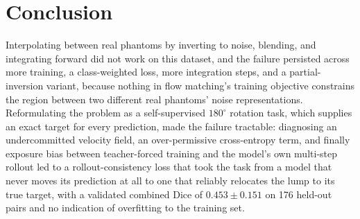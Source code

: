 \documentclass[11pt]{article}
\begin{document}
\section{Conclusion}
Interpolating between real phantoms by inverting to noise, blending, and integrating forward did
not work on this dataset, and the failure persisted across more training, a class-weighted loss,
more integration steps, and a partial-inversion variant, because nothing in flow matching's
training objective constrains the region between two different real phantoms' noise
representations. Reformulating the problem as a self-supervised $180^\circ$ rotation task, which
supplies an exact target for every prediction, made the failure tractable: diagnosing an
undercommitted velocity field, an over-permissive cross-entropy term, and finally exposure bias
between teacher-forced training and the model's own multi-step rollout led to a
rollout-consistency loss that took the task from a model that never moves its prediction at all
to one that reliably relocates the lump to its true target, with a validated combined Dice of
$0.453 \pm 0.151$ on 176 held-out pairs and no indication of overfitting to the training set.
\end{document}
